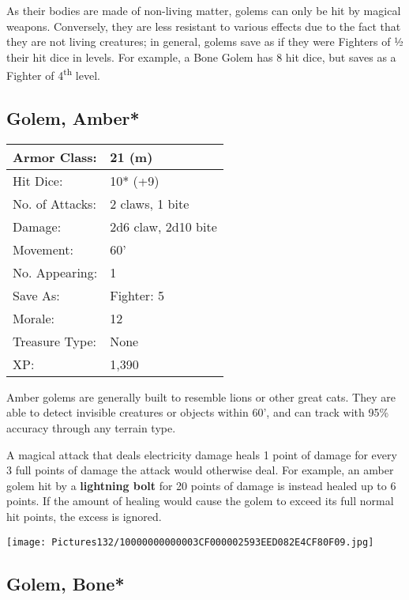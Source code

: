 \documentclass[a4paper,twoside,openany,10pt]{book}
\begin{document}
\begin{multicols}{2}
As their bodies are made of non-living matter, golems can only be hit by magical weapons. Conversely, they are less resistant to various effects due to the fact that they are not living creatures; in general, golems save as if they were Fighters of ½ their hit dice in levels. For example, a Bone Golem has 8 hit dice, but saves as a Fighter of 4\textsuperscript{th} level.

\subsection*{Golem, Amber*}\label{golem-amber}

\begin{tabularx}{0.48\textwidth}{@{}lX@{}}
Armor Class: & 21 (m) \\\hline
Hit Dice: & 10* (+9) \\\hline
No. of Attacks: & 2 claws, 1 bite \\\hline
Damage: & 2d6 claw, 2d10 bite \\\hline
Movement: & 60' \\\hline
No. Appearing: & 1 \\\hline
Save As: & Fighter: 5 \\\hline
Morale: & 12 \\\hline
Treasure Type: & None \\\hline
XP: & 1,390 \\\hline
\end{tabularx}\medskip



Amber golems are generally built to resemble lions or other great cats. They are able to detect invisible creatures or objects within 60', and can track with 95\% accuracy through any terrain type.

A magical attack that deals electricity damage heals 1 point of damage for every 3 full points of damage the attack would otherwise deal. For example, an amber golem hit by a \textbf{lightning bolt} for 20 points of damage is instead healed up to 6 points. If the amount of healing would cause the golem to exceed its full normal hit points, the excess is ignored.


\begin{center}
	\texttt{[image: Pictures132/10000000000003CF000002593EED082E4CF80F09.jpg]}
\end{center}

\columnbreak


\subsection*{Golem, Bone*}\label{golem-bone}



\end{multicols}
\end{document}
